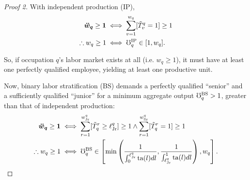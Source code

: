 \documentclass[hidelinks, nonatbib]{elsarticle}
\begin{document}
\begin{lemma}
\begin{proof}[Proof 2]
        With independent production (IP),
        \begin{align}
            \boldsymbol{\ddot{w}_q}
            \geq
            \boldsymbol{1}
            &\iff
            \sum_{v=1}^{w_{q}}
            [\tilde{T}_{v}^{q} = 1]
            \geq
            1
            \\
            \therefore
            w_q \geq 1
            &\iff
            \mho_{q}^{\text{IP}}
            \in [1, w_q]
            .
        \end{align}

        So, if occupation $q$'s labor market exists at all (i.e. $w_q \geq 1$), it must have at least one perfectly qualified employee, yielding at least one productive unit.

        Now, binary labor stratification (BS) demands a perfectly qualified ``senior'' and a sufficiently qualified ``junior'' for a minimum aggregate output $\mho_{q}^{\text{BS}} > 1$, greater than that of independent production:
        \begin{align}
            \boldsymbol{\ddot{w}_q}
            \geq
            \boldsymbol{1}
            &\iff
            \sum_{r=1}^{w_{\text{Jr}}^{q}}
            [\tilde{T}_{q}^{r} \geq \ell_{\text{Jr}}^{q}]
            \geq
            1
            \land
            \sum_{r=1}^{w_{\text{Sr}}^{q}}
            [\tilde{T}_{q}^{r} = 1]
            \geq
            1
            \\
            \therefore
            w_q \geq 1
            &\iff
            \mho_{q}^{\text{BS}}
            \in
            \left[
                \min\left(
                    \frac{
                        1
                    }{
                        \int_{0}^{\ell_{\text{Jr}}^{q}}
                        \text{ta}(l)dl
                    }
                    ,
                    \frac{
                        1
                    }{
                        \int_{\ell_{\text{Jr}}^{q}}^{1}
                        \text{ta}(l)dl
                    }
                \right)
                ,
                w_q
            \right]
            .
        \end{align}


\end{proof}
\end{lemma}
\end{document}
